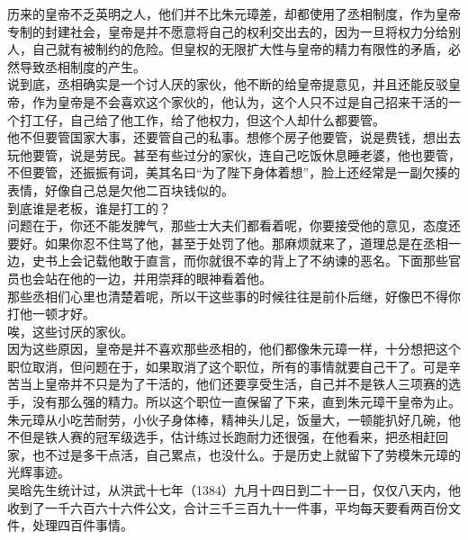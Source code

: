 \begin{multicols}{\theparacolNo}
历来的皇帝不乏英明之人，他们并不比朱元璋差，却都使用了丞相制度，作为皇帝专制的封建社会，皇帝是并不愿意将自己的权利交出去的，因为一旦将权力分给别人，自己就有被制约的危险。但皇权的无限扩大性与皇帝的精力有限性的矛盾，必然导致丞相制度的产生。\\

说到底，丞相确实是一个讨人厌的家伙，他不断的给皇帝提意见，并且还能反驳皇帝，作为皇帝是不会喜欢这个家伙的，他认为，这个人只不过是自己招来干活的一个打工仔，自己给了他工作，给了他权力，但这个人却什么都要管。\\

他不但要管国家大事，还要管自己的私事。想修个房子他要管，说是费钱，想出去玩他要管，说是劳民。甚至有些过分的家伙，连自己吃饭休息睡老婆，他也要管，不但要管，还振振有词，美其名曰“为了陛下身体着想”，脸上还经常是一副欠揍的表情，好像自己总是欠他二百块钱似的。\\

到底谁是老板，谁是打工的？\\

问题在于，你还不能发脾气，那些士大夫们都看着呢，你要接受他的意见，态度还要好。如果你忍不住骂了他，甚至于处罚了他。那麻烦就来了，道理总是在丞相一边，史书上会记载他敢于直言，而你就很不幸的背上了不纳谏的恶名。下面那些官员也会站在他的一边，并用崇拜的眼神看着他。\\

那些丞相们心里也清楚着呢，所以干这些事的时候往往是前仆后继，好像巴不得你打他一顿才好。\\

唉，这些讨厌的家伙。\\

因为这些原因，皇帝是并不喜欢那些丞相的，他们都像朱元璋一样，十分想把这个职位取消，但问题在于，如果取消了这个职位，所有的事情就要自己干了。可是辛苦当上皇帝并不只是为了干活的，他们还要享受生活，自己并不是铁人三项赛的选手，没有那么强的精力。所以这个职位一直保留了下来，直到朱元璋干皇帝为止。\\

朱元璋从小吃苦耐劳，小伙子身体棒，精神头儿足，饭量大，一顿能扒好几碗，他不但是铁人赛的冠军级选手，估计练过长跑耐力还很强，在他看来，把丞相赶回家，也不过是多干点活，自己累点，也没什么。于是历史上就留下了劳模朱元璋的光辉事迹。\\

吴晗先生统计过，从洪武十七年（1384）九月十四日到二十一日，仅仅八天内，他收到了一千六百六十六件公文，合计三千三百九十一件事，平均每天要看两百份文件，处理四百件事情。\\


\end{multicols}
